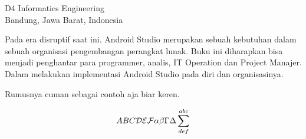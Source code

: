 

{D4 Informatics Engineering\\
Bandung, Jawa Barat, Indonesia}

Pada era disruptif   
saat ini. Android Studio merupakan sebuah kebutuhan dalam sebuah organisasi pengembangan perangkat lunak.
Buku ini diharapkan bisa menjadi penghantar para programmer, analis, IT Operation dan Project Manajer.
Dalam melakukan implementasi Android Studio pada diri dan organisasinya.

Rumusnya cuman sebagai contoh aja biar keren\cite{awangga2018sampeu}.

\begin{equation}
ABC {\cal DEF} \alpha\beta\Gamma\Delta\sum^{abc}_{def}
\end{equation}
